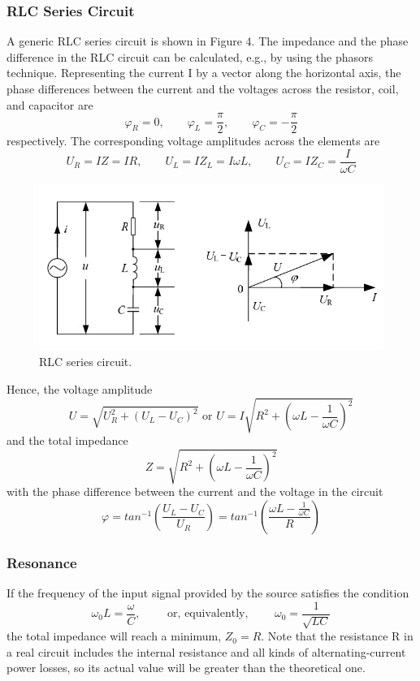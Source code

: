 \documentclass{article}
\begin{document}
\subsubsection{RLC Series Circuit}
A generic RLC series circuit is shown in Figure 4. The impedance and the phase difference in the RLC circuit can be calculated, e.g., by using the phasors technique. Representing the current I by a vector along the horizontal axis, the phase differences between the current and the voltages across the resistor, coil, and capacitor are
$$ \varphi_R=0,\qquad \varphi_L=\dfrac{\pi}{2},\qquad \varphi_C=-\dfrac{\pi}{2} $$
respectively. The corresponding voltage amplitudes across the elements are
$$ U_R=IZ=IR,\qquad U_L=IZ_L=I\omega L,\qquad U_C=IZ_C=\dfrac{I}{\omega C} $$

\begin{figure}[H]
	\centering
	\includegraphics[scale=0.6]{fig4.jpg}
	\caption{RLC series circuit.}
\end{figure}

Hence, the voltage amplitude
\begin{equation}
	U=\sqrt{U_R^2+(U_L-U_C)^2} \text{ or } U=I\sqrt{R^2+\left(\omega L-\dfrac{1}{\omega C}\right)^2}
\end{equation}
and the total impedance
\begin{equation}
	 Z=\sqrt{R^2+\left(\omega L-\dfrac{1}{\omega C}\right)^2}
\end{equation}
with the phase difference between the current and the voltage in the circuit
$$ \varphi=tan^{-1}\left(\dfrac{U_L-U_C}{U_R}\right)=tan^{-1}\left(\dfrac{\omega L-\frac{1}{\omega C}}{R}\right) $$

\subsubsection{Resonance}
If the frequency of the input signal provided by the source satisfies the condition
$$ \omega_0 L=\dfrac{\omega}{C},\qquad \text{ or, equivalently, }\qquad \omega_0=\dfrac{1}{\sqrt{LC}} $$
the total impedance will reach a minimum, $ Z_0 = R $. Note that the resistance R in a real circuit includes the internal resistance and all kinds of alternating-current power losses, so its actual value will be greater than the theoretical one.\\
\end{document}
